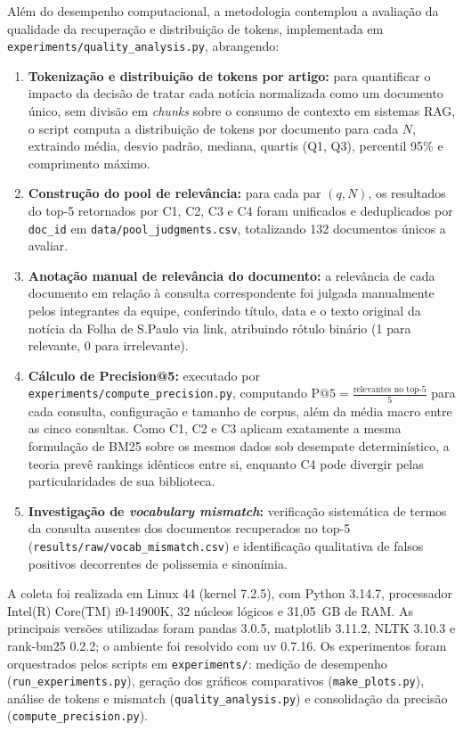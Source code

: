 \documentclass[12pt, a4paper]{article}
\begin{document}
Além do desempenho computacional, a metodologia contemplou a avaliação da qualidade da recuperação e distribuição de tokens, implementada em \texttt{experiments/quality\_analysis.py}, abrangendo:
\begin{enumerate}
    \item \textbf{Tokenização e distribuição de tokens por artigo:} para quantificar o impacto da decisão de tratar cada notícia normalizada como um documento único, sem divisão em \textit{chunks} sobre o consumo de contexto em sistemas RAG, o script computa a distribuição de tokens por documento para cada $N$, extraindo média, desvio padrão, mediana, quartis (Q1, Q3), percentil 95\% e comprimento máximo.
    \item \textbf{Construção do pool de relevância:} para cada par $(q, N)$, os resultados do top-5 retornados por C1, C2, C3 e C4 foram unificados e deduplicados por \texttt{doc\_id} em \texttt{data/pool\_judgments.csv}, totalizando 132 documentos únicos a avaliar.
    \item \textbf{Anotação manual de relevância do documento:} a relevância de cada documento em relação à consulta correspondente foi julgada manualmente pelos integrantes da equipe, conferindo título, data e o texto original da notícia da Folha de S.Paulo via link, atribuindo rótulo binário (1 para relevante, 0 para irrelevante).
    \item \textbf{Cálculo de Precision@5:} executado por \texttt{experiments/compute\_precision.py}, computando $\text{P@5} = \frac{\text{relevantes no top-5}}{5}$ para cada consulta, configuração e tamanho de corpus, além da média macro entre as cinco consultas. Como C1, C2 e C3 aplicam exatamente a mesma formulação de BM25 sobre os mesmos dados sob desempate determinístico, a teoria prevê rankings idênticos entre si, enquanto C4 pode divergir pelas particularidades de sua biblioteca.
    \item \textbf{Investigação de \textit{vocabulary mismatch}:} verificação sistemática de termos da consulta ausentes dos documentos recuperados no top-5 (\texttt{results/raw/vocab\_mismatch.csv}) e identificação qualitativa de falsos positivos decorrentes de polissemia e sinonímia.
\end{enumerate}

A coleta foi realizada em Linux 44 (kernel 7.2.5), com Python 3.14.7, processador Intel(R) Core(TM) i9-14900K, 32 núcleos lógicos e 31,05~GB de RAM. As principais versões utilizadas foram pandas 3.0.5, matplotlib 3.11.2, NLTK 3.10.3 e rank-bm25 0.2.2; o ambiente foi resolvido com uv 0.7.16. Os experimentos foram orquestrados pelos scripts em \texttt{experiments/}: medição de desempenho (\texttt{run\_experiments.py}), geração dos gráficos comparativos (\texttt{make\_plots.py}), análise de tokens e mismatch (\texttt{quality\_analysis.py}) e consolidação da precisão (\texttt{compute\_precision.py}).
\end{document}
